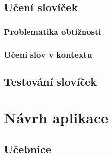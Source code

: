 \documentclass[a4paper,11pt,titlepage,fleqn]{article}
\begin{document}

    \subsection{Učení slovíček}

        \subsubsection{Problematika obtížnosti}

        \subsubsection{Učení slov v kontextu}
    
    \subsection{Testování slovíček}

    

\newpage
\section{Návrh aplikace}
    
    \subsection{Učebnice}
\end{document}
